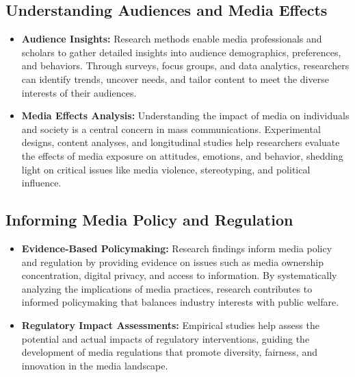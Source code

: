 \documentclass[
]{book}
\providecommand{\tightlist}{%
  \setlength{\itemsep}{0pt}\setlength{\parskip}{0pt}}
\begin{document}
\hypertarget{understanding-audiences-and-media-effects}{%
\subsection*{Understanding Audiences and Media Effects}\label{understanding-audiences-and-media-effects}}

\begin{itemize}
\tightlist
\item
  \textbf{Audience Insights:} Research methods enable media professionals and scholars to gather detailed insights into audience demographics, preferences, and behaviors. Through surveys, focus groups, and data analytics, researchers can identify trends, uncover needs, and tailor content to meet the diverse interests of their audiences.
\item
  \textbf{Media Effects Analysis:} Understanding the impact of media on individuals and society is a central concern in mass communications. Experimental designs, content analyses, and longitudinal studies help researchers evaluate the effects of media exposure on attitudes, emotions, and behavior, shedding light on critical issues like media violence, stereotyping, and political influence.
\end{itemize}

\hypertarget{informing-media-policy-and-regulation}{%
\subsection*{Informing Media Policy and Regulation}\label{informing-media-policy-and-regulation}}

\begin{itemize}
\tightlist
\item
  \textbf{Evidence-Based Policymaking:} Research findings inform media policy and regulation by providing evidence on issues such as media ownership concentration, digital privacy, and access to information. By systematically analyzing the implications of media practices, research contributes to informed policymaking that balances industry interests with public welfare.
\item
  \textbf{Regulatory Impact Assessments:} Empirical studies help assess the potential and actual impacts of regulatory interventions, guiding the development of media regulations that promote diversity, fairness, and innovation in the media landscape.
\end{itemize}
\end{document}
